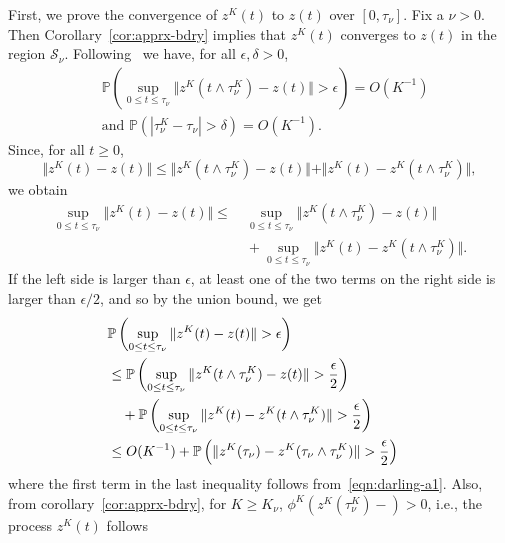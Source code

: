\documentclass[10pt,journal,letterpaper]{IEEEtran}
\begin{document}
\noindent
\begin{inparaenum}[(a)]
\item First, we prove the convergence of $z^K(t)$ to $z(t)$ over
$[0,\tau_{\nu}]$. Fix a $\nu > 0$.
Then Corollary~\ref{cor:apprx-bdry} implies that
$z^K(t)$ converges to $z(t)$ in the region $\mathcal{S}_{\nu}$. Following~\cite[Theorem~2.8]{stochproc.darling02fluid-limits} we
have, for all $\epsilon,\delta > 0$,
\begin{subequations}
\begin{align}
& \mathbb{P}\left(\sup_{0 \leq t \leq \tau_{\nu}} \Vert z^K(t
\wedge \tau^K_{\nu}) - z(t) \Vert > \epsilon \right) =
O(K^{-1}) \label{eqn:darling-a1}\\
&\mbox{and } \mathbb{P}(|\tau^K_{\nu} - \tau_{\nu}| > \delta) =
O(K^{-1}) \label{eqn:darling-a2} .
\end{align}
\end{subequations}
Since, for all $t \geq 0$,
\[
\Vert z^K(t)- z(t) \Vert \leq \Vert z^K(t \wedge \tau^K_{\nu}) -
z(t) \Vert + \Vert z^K(t) -  z^K(t \wedge \tau^K_{\nu}) \Vert,
\]
we obtain
\begin{align*}
\sup_{0 \leq t \leq \tau_{\nu}} \Vert z^K(t)- z(t) \Vert \leq
&~\sup_{0 \leq t \leq \tau_{\nu}} \Vert z^K(t \wedge \tau^K_{\nu}) -
z(t) \Vert \\
&~+ \sup_{0 \leq t \leq \tau_{\nu}} \Vert z^K(t) - z^K(t \wedge
\tau^K_{\nu}) \Vert.
\end{align*}
If the left side is larger than $\epsilon$, at least one of the two
terms on the right side is larger than $\epsilon/2$, and so by the
union bound, we get
\begin{align}
\lefteqn{\mathbb{P}\left(\sup_{0 \leq t \leq \tau_{\nu}} \Vert
z^K(t)- z(t) \Vert > \epsilon \right)} \nonumber \\
& \leq \mathbb{P}\left( \sup_{0 \leq t \leq \tau_{\nu}} \Vert z^K(t
\wedge \tau^K_{\nu}) - z(t) \Vert > \frac{\epsilon}{2}\right) \nonumber \\
&~ \ \ + \mathbb{P}\left( \sup_{0 \leq t \leq
\tau_{\nu}} \Vert z^K(t) - z^K(t \wedge \tau^K_{\nu}) \Vert > \frac{\epsilon}{2} \right) \nonumber\\
& \leq O(K^{-1}) + \mathbb{P}\left(\Vert z^K(\tau_{\nu}) -
z^K(\tau_{\nu}
 \wedge \tau^K_{\nu}) \Vert > \frac{\epsilon}{2} \right) \label{eqn:bound-1}
\end{align}
where the first term in the last inequality follows
from~\eqref{eqn:darling-a1}. Also, from
corollary~\ref{cor:apprx-bdry}, for $K \geq K_{\nu}$,
$\phi^K(z^K(\tau^K_{\nu})-) > 0$, i.e., the process $z^K(t)$ follows

\end{inparaenum}
\end{document}
